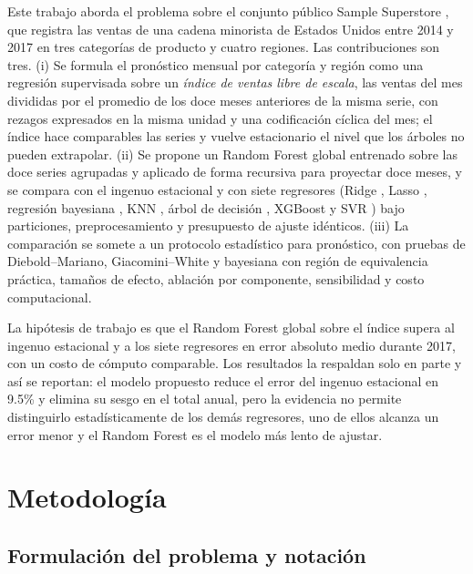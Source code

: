 \documentclass[pdflatex,sn-mathphys-num]{sn-jnl}
\begin{document}
Este trabajo aborda el problema sobre el conjunto público Sample Superstore \cite{superstore}, que registra las ventas de una cadena minorista de Estados Unidos entre 2014 y 2017 en tres categorías de producto y cuatro regiones. Las contribuciones son tres. (i) Se formula el pronóstico mensual por categoría y región como una regresión supervisada sobre un \emph{índice de ventas libre de escala}, las ventas del mes divididas por el promedio de los doce meses anteriores de la misma serie, con rezagos expresados en la misma unidad y una codificación cíclica del mes; el índice hace comparables las series y vuelve estacionario el nivel que los árboles no pueden extrapolar. (ii) Se propone un Random Forest global entrenado sobre las doce series agrupadas y aplicado de forma recursiva para proyectar doce meses, y se compara con el ingenuo estacional y con siete regresores (Ridge \cite{hoerl1970}, Lasso \cite{tibshirani1996}, regresión bayesiana \cite{mackay1992}, KNN \cite{cover1967}, árbol de decisión \cite{breiman1984}, XGBoost \cite{chen2016} y SVR \cite{drucker1997}) bajo particiones, preprocesamiento y presupuesto de ajuste idénticos. (iii) La comparación se somete a un protocolo estadístico para pronóstico, con pruebas de Diebold--Mariano, Giacomini--White y bayesiana con región de equivalencia práctica, tamaños de efecto, ablación por componente, sensibilidad y costo computacional.

La hipótesis de trabajo es que el Random Forest global sobre el índice supera al ingenuo estacional y a los siete regresores en error absoluto medio durante 2017, con un costo de cómputo comparable. Los resultados la respaldan solo en parte y así se reportan: el modelo propuesto reduce el error del ingenuo estacional en 9.5\% y elimina su sesgo en el total anual, pero la evidencia no permite distinguirlo estadísticamente de los demás regresores, uno de ellos alcanza un error menor y el Random Forest es el modelo más lento de ajustar.

\section{Metodología}\label{sec:metodologia}

\subsection{Formulación del problema y notación}\label{subsec:formulacion}
\end{document}
